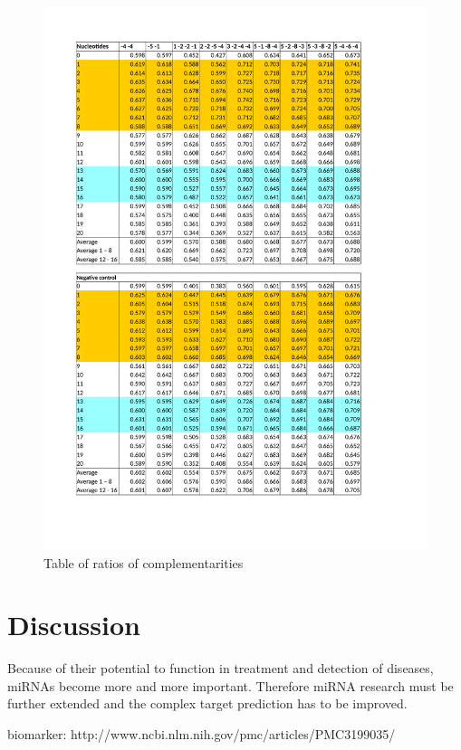 \documentclass[12pt]{article}
\begin{document}
\begin{figure}
\vspace{-3cm}
\includegraphics[scale=0.8]{results/ratio_table.pdf}
\vspace{-2.8cm}
\caption{Table of ratios of complementarities}
\label{table:ratios}
\end{figure}



\section{Discussion}
Because of their potential to function in treatment and detection of diseases, miRNAs become more and more important. Therefore miRNA research must be further extended and the complex target prediction has to be improved.


biomarker: http://www.ncbi.nlm.nih.gov/pmc/articles/PMC3199035/
\end{document}
